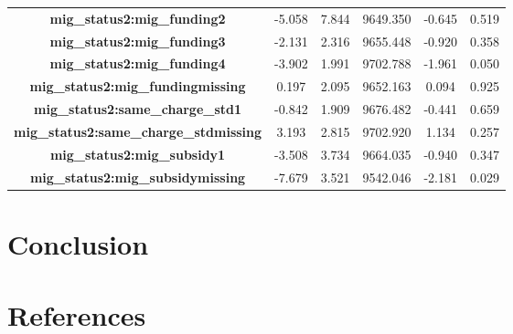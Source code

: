 \documentclass[
  man,
  floatsintext,
  longtable,
  nolmodern,
  notxfonts,
  notimes,
  colorlinks=true,linkcolor=blue,citecolor=blue,urlcolor=blue]{apa7}
\begin{document}
\begin{table}
\begin{longtable*}[t]{>{}cccccc}
\textbf{mig\_status2:mig\_funding2} & -5.058 & 7.844 & 9649.350 & -0.645 & 0.519\\
\textbf{mig\_status2:mig\_funding3} & -2.131 & 2.316 & 9655.448 & -0.920 & 0.358\\
\addlinespace
\textbf{mig\_status2:mig\_funding4} & -3.902 & 1.991 & 9702.788 & -1.961 & 0.050\\
\textbf{mig\_status2:mig\_fundingmissing} & 0.197 & 2.095 & 9652.163 & 0.094 & 0.925\\
\textbf{mig\_status2:same\_charge\_std1} & -0.842 & 1.909 & 9676.482 & -0.441 & 0.659\\
\textbf{mig\_status2:same\_charge\_stdmissing} & 3.193 & 2.815 & 9702.920 & 1.134 & 0.257\\
\textbf{mig\_status2:mig\_subsidy1} & -3.508 & 3.734 & 9664.035 & -0.940 & 0.347\\
\addlinespace
\textbf{mig\_status2:mig\_subsidymissing} & -7.679 & 3.521 & 9542.046 & -2.181 & 0.029\\
\bottomrule
\end{longtable*}
\endgroup{}

\end{table}

\section{Conclusion}\label{conclusion}

\clearpage

\section{References}\label{references}
\end{document}
